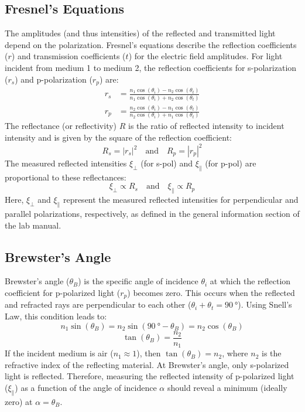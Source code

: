 \documentclass[journal]{IEEEtran}
\begin{document}
\subsection{Fresnel's Equations}
The amplitudes (and thus intensities) of the reflected and transmitted light depend on the polarization. Fresnel's equations describe the reflection coefficients ($r$) and transmission coefficients ($t$) for the electric field amplitudes. For light incident from medium 1 to medium 2, the reflection coefficients for s-polarization ($r_s$) and p-polarization ($r_p$) are:
\begin{align}
    r_s &= \frac{n_1 \cos(\theta_i) - n_2 \cos(\theta_t)}{n_1 \cos(\theta_i) + n_2 \cos(\theta_t)} \\
    r_p &= \frac{n_2 \cos(\theta_i) - n_1 \cos(\theta_t)}{n_2 \cos(\theta_i) + n_1 \cos(\theta_t)}
\end{align}
The reflectance (or reflectivity) $R$ is the ratio of reflected intensity to incident intensity and is given by the square of the reflection coefficient:
\begin{equation}
    R_s = |r_s|^2 \quad \text{and} \quad R_p = |r_p|^2
\end{equation}
The measured reflected intensities $\xi_{\perp}$ (for s-pol) and $\xi_{\parallel}$ (for p-pol) are proportional to these reflectances:
\begin{equation}
    \xi_{\perp} \propto R_s \quad \text{and} \quad \xi_{\parallel} \propto R_p
\end{equation}
Here, $\xi_{\perp}$ and $\xi_{\parallel}$ represent the measured reflected intensities for perpendicular and parallel polarizations, respectively, as defined in the general information section of the lab manual.

\subsection{Brewster's Angle}
Brewster's angle ($\theta_B$) is the specific angle of incidence $\theta_i$ at which the reflection coefficient for p-polarized light ($r_p$) becomes zero. This occurs when the reflected and refracted rays are perpendicular to each other ($\theta_i + \theta_t = \SI{90}{\degree}$). Using Snell's Law, this condition leads to:
\begin{equation}
    n_1 \sin(\theta_B) = n_2 \sin(\SI{90}{\degree} - \theta_B) = n_2 \cos(\theta_B)
\end{equation}
\begin{equation}
    \tan(\theta_B) = \frac{n_2}{n_1}
    \label{eq:brewster}
\end{equation}
If the incident medium is air ($n_1 \approx 1$), then $\tan(\theta_B) = n_2$, where $n_2$ is the refractive index of the reflecting material. At Brewster's angle, only s-polarized light is reflected. Therefore, measuring the reflected intensity of p-polarized light ($\xi_{\parallel}$) as a function of the angle of incidence $\alpha$ should reveal a minimum (ideally zero) at $\alpha = \theta_B$.
\end{document}

